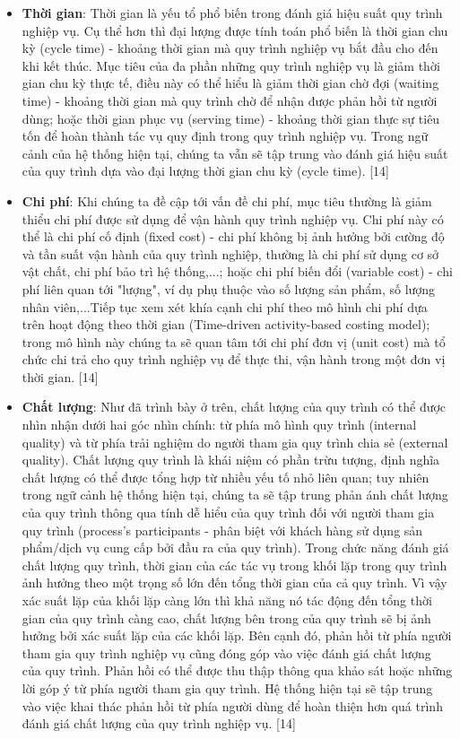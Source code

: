 \begin{itemize}
      \item \textbf{Thời gian}: Thời gian là yếu tổ phổ biến trong đánh giá hiệu suất quy trình nghiệp vụ. Cụ thể hơn thì đại lượng được tính toán phổ biến là thời gian chu kỳ (cycle time) - khoảng thời gian mà quy trình nghiệp vụ bắt đầu cho đến khi kết thúc. Mục tiêu của đa phần những quy trình nghiệp vụ là giảm thời gian chu kỳ thực tế, điều này có thể hiểu là giảm thời gian chờ đợi (waiting time) - khoảng thời gian mà quy trình chờ để nhận được phản hồi từ người dùng; hoặc thời gian phục vụ (serving time) - khoảng thời gian thực sự tiêu tốn để hoàn thành tác vụ quy định trong quy trình nghiệp vụ. Trong ngữ cảnh của hệ thống hiện tại, chúng ta vẫn sẽ tập trung vào đánh giá hiệu suất của quy trình dựa vào đại lượng thời gian chu kỳ (cycle time). [14]
      \item \textbf{Chi phí}: Khi chúng ta đề cập tới vấn đề chi phí, mục tiêu thường là giảm thiểu chi phí được sử dụng để vận hành quy trình nghiệp vụ. Chi phí này có thể là chi phí cố định (fixed cost) - chi phí không bị ảnh hưởng bởi cường độ và tần suất vận hành của quy trình nghiệp, thường là chi phí sử dụng cơ sở vật chất, chi phí bảo trì hệ thống,...; hoặc chi phí biến đổi (variable cost) - chi phí liên quan tới "lượng", ví dụ phụ thuộc vào số lượng sản phẩm, số lượng nhân viên,...Tiếp tục xem xét khía cạnh chi phí theo mô hình chi phí dựa trên hoạt động theo thời gian (Time-driven activity-based costing model); trong mô hình này chúng ta sẽ quan tâm tới chi phí đơn vị (unit cost) mà tổ chức chi trả cho quy trình nghiệp vụ để thực thi, vận hành trong một đơn vị thời gian. [14]
      \item \textbf{Chất lượng}: Như đã trình bày ở trên, chất lượng của quy trình có thể được nhìn nhận dưới hai góc nhìn chính: từ phía mô hình quy trình (internal quality) và từ phía trải nghiệm do người tham gia quy trình chia sẻ (external quality). Chất lượng quy trình là khái niệm có phần trừu tượng, định nghĩa chất lượng có thể được tổng hợp từ nhiều yếu tố nhỏ liên quan; tuy nhiên trong ngữ cảnh hệ thống hiện tại, chúng ta sẽ tập trung phản ánh chất lượng của quy trình thông qua tính dễ hiểu của quy trình đối với người tham gia quy trình (process's participants - phân biệt với khách hàng sử dụng sản phẩm/dịch vụ cung cấp bởi đầu ra của quy trình). Trong chức năng đánh giá chất lượng quy trình, thời gian của các tác vụ trong khối lặp trong quy trình ảnh hưởng theo một trọng số lớn đến tổng thời gian của cả quy trình. Vì vậy xác suất lặp của khối lặp càng lớn thì khả năng nó tác động đến tổng thời gian của quy trình càng cao, chất lượng bên trong của quy trình sẽ bị ảnh hưởng bởi xác suất lặp của các khối lặp. Bên cạnh đó, phản hồi từ phía người tham gia quy trình nghiệp vụ cũng đóng góp vào việc đánh giá chất lượng của quy trình. Phản hồi có thể được thu thập thông qua khảo sát hoặc những lời góp ý từ phía người tham gia quy trình. Hệ thống hiện tại sẽ tập trung vào việc khai thác phản hồi từ phía người dùng để hoàn thiện hơn quá trình đánh giá chất lượng của quy trình nghiệp vụ. [14]

\end{itemize}
